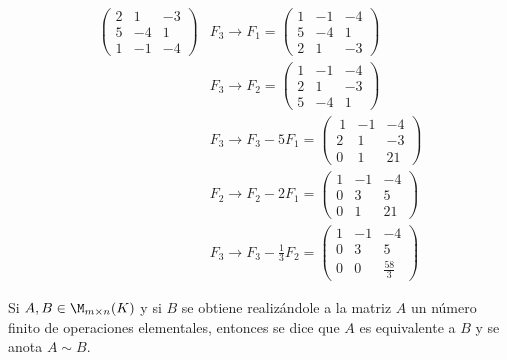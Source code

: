\begin{ejem}
\begin{align*}
     \begin{pmatrix}  2 & 1 & -3  \\ 5  & -4 & 1  \\ 1 & -1 & -4  \end{pmatrix} & F_3 \rightarrow F_1 = \begin{pmatrix}  1 & -1 & -4  \\ 5  & -4 & 1  \\ 2 & 1 & -3 \end{pmatrix} \\
     & F_3 \rightarrow F_2 =  \begin{pmatrix}  1 & -1 & -4  \\ 2 & 1 & -3  \\ 5  & -4 & 1  \end{pmatrix} \\
     &F_3 \rightarrow F_3 - 5F_1 = \begin{pmatrix} \ 1 & -1 & -4  \\ 2 & 1 & -3 \\  0 & 1 & 21  \end{pmatrix} \\
     &F_2 \rightarrow F_2 - 2F_1 = \begin{pmatrix}  1 & -1 & -4  \\ 0 & 3 & 5  \\  0 & 1 & 21  \end{pmatrix} \\
     &F_3 \rightarrow F_3 - \frac{1}{3} F_2 = \begin{pmatrix}  1 & -1 & -4  \\ 0 & 3 & 5  \\  0 & 0 & \frac{58}{3}  \end{pmatrix}
\end{align*}

\end{ejem}


\begin{defin}
Si $A, B \in \M_{m\times n}(K)$ y si $B$ se obtiene realizándole a la matriz $A$ un número finito de operaciones
elementales, entonces se dice que $A$ es equivalente a $B$ y se anota $A \sim B$.
\end{defin}

